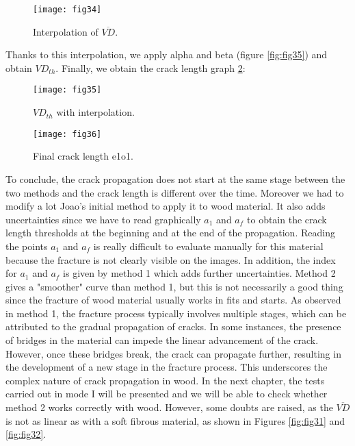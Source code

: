 \begin{figure}[htp]
	\centering
	\texttt{[image: fig34]}
	\caption{Interpolation of $\overline{VD}$.}
	\label{fig:fig34}
\end{figure}

Thanks to this interpolation, we apply alpha and beta (figure \ref{fig:fig35}) and obtain $VD_{th}$. Finally, we obtain the crack length graph \ref{fig:fig36}:

\begin{figure}[h]
	\begin{minipage}[c]{.46\linewidth}
		\centering
		\texttt{[image: fig35]}
		\caption{$VD_{th}$ with interpolation.}
		\label{fig:fig35}
	\end{minipage}
	\hfill%
	\begin{minipage}[c]{.46\linewidth}
		\centering
		\texttt{[image: fig36]}
		\caption{Final crack length e1o1.}
		\label{fig:fig36}
	\end{minipage}
\end{figure}

To conclude, the crack propagation does not start at the same stage between the two methods and the crack length is different over the time. Moreover we had to modify a lot Joao's initial method to apply it to wood material. It also adds uncertainties since we have to read graphically $a_1$ and $a_f$ to obtain the crack length thresholds at the beginning and at the end of the propagation. Reading the points $a_1$ and $a_f$ is really difficult to evaluate manually for this material because the fracture is not clearly visible on the images. In addition, the index for $a_1$ and $a_f$ is given by method 1 which adds further uncertainties. Method 2 gives a "smoother" curve than method 1, but this is not necessarily a good thing since the fracture of wood material usually works in fits and starts.
As observed in method 1, the fracture process typically involves multiple stages, which can be attributed to the gradual propagation of cracks. In some instances, the presence of bridges in the material can impede the linear advancement of the crack. However, once these bridges break, the crack can propagate further, resulting in the development of a new stage in the fracture process. This underscores the complex nature of crack propagation in wood. In the next chapter, the tests carried out in mode I will be presented and we will be able to check whether method 2 works correctly with wood. However, some doubts are raised, as the $\overline{VD}$ is not as linear as with a soft fibrous material, as shown in Figures \ref{fig:fig31} and \ref{fig:fig32}.

